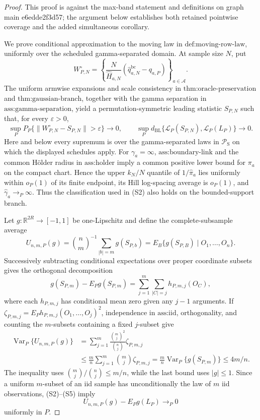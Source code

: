 \documentclass{article}
\begin{document}
\begin{proof}
This proof is against the max-band statement and definitions on graph main e6edde2f3d57; the argument below establishes both retained pointwise coverage and the added simultaneous corollary.

We prove conditional approximation to the moving law in \(\text{def:moving-row-law}\), uniformly over the scheduled gamma-separated domain. At sample size \(N\), put
\[
W_{P,N}^{\circ}=\left\{
\frac N{\widehat H_{a,N}}(\widehat q_{a,N}^{\mathrm{bc}}-q_{a,P})
\right\}_{a\in\mathcal A}.
\tag{S1}
\]
The uniform armwise expansions and scale consistency in \(\text{thm:oracle-preservation}\) and \(\text{thm:gaussian-branch}\), together with the gamma separation in \(\text{ass:gamma-separation}\), yield a permutation-symmetric leading statistic \(S_{P,N}\) such that, for every \(\varepsilon>0\),
\[
\sup_PP_P\{\|W_{P,N}^{\circ}-S_{P,N}\|>\varepsilon\}\to0,
\qquad
\sup_Pd_{\mathrm{BL}}\{\mathcal L_P(S_{P,N}),\mathcal L_P(L_P)\}\to0.
\tag{S2}
\]
Here and below every supremum is over the gamma-separated laws in \(\mathcal P_{\mathrm S}\) on which the displayed schedules apply. For \(\gamma_a=\infty\), \(\text{ass:boundary-link}\) and the common Hölder radius in \(\text{ass:holder}\) imply a common positive lower bound for \(\pi_a\) on the compact chart. Hence the upper \(k_N/N\) quantile of \(1/\widehat\pi_a\) lies uniformly within \(o_P(1)\) of its finite endpoint, its Hill log-spacing average is \(o_P(1)\), and \(\widehat\gamma_a\to_P\infty\). Thus the classification used in (S2) also holds on the bounded-support branch.

Let \(g:\mathbb R^{2R}\to[-1,1]\) be one-Lipschitz and define the complete-subsample average
\[
U_{n,m,P}(g)=\binom nm^{-1}\sum_{|b|=m}g(S_{P,b})
=E_B\{g(S_{P,B})\mid O_1,\ldots,O_n\}.
\tag{S3}
\]
Successively subtracting conditional expectations over proper coordinate subsets gives the orthogonal decomposition
\[
g(S_{P,m})-E_Pg(S_{P,m})
=\sum_{j=1}^m\sum_{|C|=j}h_{P,m,j}(O_C),
\tag{S4}
\]
where each \(h_{P,m,j}\) has conditional mean zero given any \(j-1\) arguments. If
\(\zeta_{P,m,j}=E_Ph_{P,m,j}(O_1,\ldots,O_j)^2\), independence in \(\text{ass:iid}\), orthogonality, and counting the \(m\)-subsets containing a fixed \(j\)-subset give
\[
\begin{split}
\operatorname{Var}_P\{U_{n,m,P}(g)\}
&=\sum_{j=1}^m\frac{\binom mj^2}{\binom nj}\zeta_{P,m,j}\\
&\le\frac mn\sum_{j=1}^m\binom mj\zeta_{P,m,j}
=\frac mn\operatorname{Var}_P\{g(S_{P,m})\}
\le4m/n.
\end{split}
\tag{S5}
\]
The inequality uses \(\binom mj/\binom nj\le m/n\), while the last bound uses \(|g|\le1\). Since a uniform \(m\)-subset of an iid sample has unconditionally the law of \(m\) iid observations, (S2)--(S5) imply
\[
U_{n,m,P}(g)-E_Pg(L_P)\to_P0
\tag{S6}
\]
uniformly in \(P\).


\end{proof}
\end{document}
